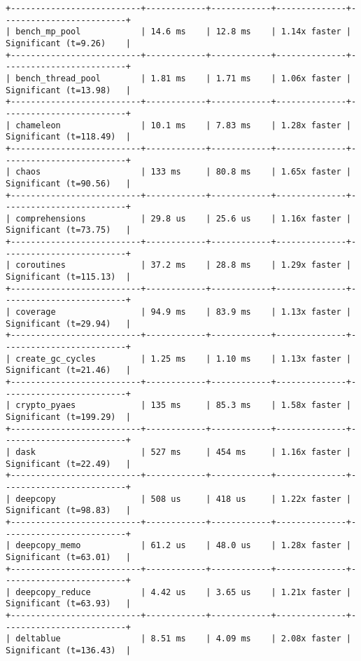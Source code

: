 \begin{code}
\begin{verbatim}
+--------------------------+------------+------------+--------------+-------------------------+
| bench_mp_pool            | 14.6 ms    | 12.8 ms    | 1.14x faster | Significant (t=9.26)    |
+--------------------------+------------+------------+--------------+-------------------------+
| bench_thread_pool        | 1.81 ms    | 1.71 ms    | 1.06x faster | Significant (t=13.98)   |
+--------------------------+------------+------------+--------------+-------------------------+
| chameleon                | 10.1 ms    | 7.83 ms    | 1.28x faster | Significant (t=118.49)  |
+--------------------------+------------+------------+--------------+-------------------------+
| chaos                    | 133 ms     | 80.8 ms    | 1.65x faster | Significant (t=90.56)   |
+--------------------------+------------+------------+--------------+-------------------------+
| comprehensions           | 29.8 us    | 25.6 us    | 1.16x faster | Significant (t=73.75)   |
+--------------------------+------------+------------+--------------+-------------------------+
| coroutines               | 37.2 ms    | 28.8 ms    | 1.29x faster | Significant (t=115.13)  |
+--------------------------+------------+------------+--------------+-------------------------+
| coverage                 | 94.9 ms    | 83.9 ms    | 1.13x faster | Significant (t=29.94)   |
+--------------------------+------------+------------+--------------+-------------------------+
| create_gc_cycles         | 1.25 ms    | 1.10 ms    | 1.13x faster | Significant (t=21.46)   |
+--------------------------+------------+------------+--------------+-------------------------+
| crypto_pyaes             | 135 ms     | 85.3 ms    | 1.58x faster | Significant (t=199.29)  |
+--------------------------+------------+------------+--------------+-------------------------+
| dask                     | 527 ms     | 454 ms     | 1.16x faster | Significant (t=22.49)   |
+--------------------------+------------+------------+--------------+-------------------------+
| deepcopy                 | 508 us     | 418 us     | 1.22x faster | Significant (t=98.83)   |
+--------------------------+------------+------------+--------------+-------------------------+
| deepcopy_memo            | 61.2 us    | 48.0 us    | 1.28x faster | Significant (t=63.01)   |
+--------------------------+------------+------------+--------------+-------------------------+
| deepcopy_reduce          | 4.42 us    | 3.65 us    | 1.21x faster | Significant (t=63.93)   |
+--------------------------+------------+------------+--------------+-------------------------+
| deltablue                | 8.51 ms    | 4.09 ms    | 2.08x faster | Significant (t=136.43)  |

\end{verbatim}
\end{code}
